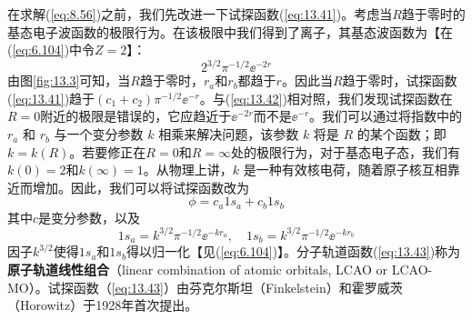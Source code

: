     在求解(\ref{eq:8.56})之前，我们先改进一下试探函数(\ref{eq:13.41})。考虑当$R$趋于零时的基态电子波函数的极限行为。在该极限中我们得到了离子，其基态波函数为【在(\ref{eq:6.104})中令$Z=2$】：
    \begin{equation}
        2^{3/2}\pi^{-1/2}\ee ^{-2r}
        \label{eq:13.42}
    \end{equation}
    由图\ref{fig:13.3}可知，当$R$趋于零时，$r_a$和$r_b$都趋于$r$。因此当$R$趋于零时，试探函数(\ref{eq:13.41})趋于$\left(c_1+c_2\right)\pi^{-1/2}\ee ^{-r}$。与(\ref{eq:13.42})相对照，我们发现试探函数在$R=0$附近的极限是错误的，它应趋近于$\ee ^{-2r}$而不是$\ee ^{-r}$。我们可以通过将指数中的 $r_a$ 和 $r_b$ 与一个变分参数 $k$ 相乘来解决问题，该参数 $k$ 将是 $R$ 的某个函数；即 $k = k\left(R\right)$。若要修正在$R=0$和$R=\infty$处的极限行为，对于基态电子态，我们有$k\left(0\right)=2$和$k\left(\infty\right)=1$。从物理上讲，$k$ 是一种有效核电荷，随着原子核互相靠近而增加。因此，我们可以将试探函数改为
    \begin{equation}
        \phi = c_a1s_a + c_b1s_b
        \label{eq:13.43}
    \end{equation}
    其中$c$是变分参数，以及
    \begin{equation}
        1s_a = k^{3/2} \pi^{-1/2} \ee ^{-kr_a}, \quad 1s_b = k^{3/2} \pi^{-1/2} \ee ^{-kr_b}
        \label{eq:13.44}
    \end{equation}
    因子$k^{3/2}$使得$1s_a$和$1s_b$得以归一化【见(\ref{eq:6.104})】。分子轨道函数(\ref{eq:13.43})称为\textbf{原子轨道线性组合}（linear combination of atomic orbitals, LCAO or LCAO-MO）。试探函数（\ref{eq:13.43}）由芬克尔斯坦（Finkelstein）和霍罗威茨（Horowitz）于1928年首次提出。

